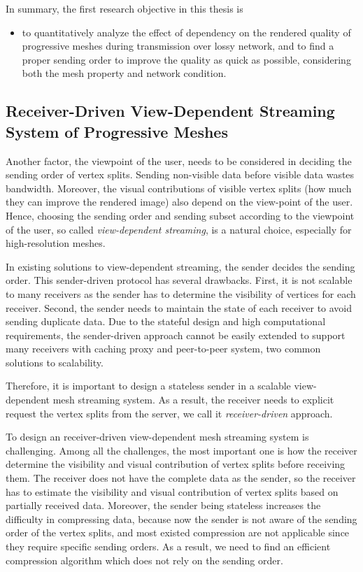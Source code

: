 \documentclass[11pt, a4paper]{report}
\begin{document}
    In summary, the first research objective in this thesis is
    \begin{itemize}
        \item
            to quantitatively analyze the effect of dependency on 
            the rendered quality of progressive meshes 
            during transmission over lossy network, and to find
            a proper sending order to improve the quality as quick
            as possible, considering both the mesh property and network condition. 
    \end{itemize}
    
    \subsection{Receiver-Driven View-Dependent Streaming System of Progressive Meshes}
    Another factor, the viewpoint of the user, 
    needs to be considered in deciding the sending order of vertex splits.
    Sending non-visible data before visible data wastes bandwidth. 
    Moreover, the visual contributions of visible
    vertex splits (how much they can improve the rendered image)
    also depend on the view-point of the user.
    Hence, choosing the sending order and sending subset 
    according to the viewpoint of the user, 
    so called \emph{view-dependent streaming}, 
    is a natural choice, especially
    for high-resolution meshes.
    
    In existing solutions to view-dependent streaming,  
    the sender decides the sending order. 
    This sender-driven protocol has several drawbacks. 
    First, it is not scalable to many receivers as the sender has to
    determine the visibility of vertices for each receiver. 
    Second, the sender needs to maintain
    the state of each receiver to avoid sending duplicate data. 
    Due to the stateful design and high computational requirements,
    the sender-driven approach cannot be easily extended to support 
    many receivers with caching proxy and peer-to-peer system,
    two common solutions to scalability. 

    Therefore, it is important to design a stateless sender in
    a scalable view-dependent mesh streaming system. As a result,
    the receiver needs to explicit request the vertex splits from
    the server, we call it \textit{receiver-driven} approach.
    
    To design an receiver-driven view-dependent mesh streaming
    system is challenging. Among all the challenges, the most important
    one is how the receiver determine the visibility and visual contribution
    of vertex splits before receiving them. The receiver does not have
    the complete data as the sender, so the receiver has to estimate
    the visibility and visual contribution of vertex splits based on 
    partially received data. Moreover, the sender being stateless increases
    the difficulty in compressing data, because now the sender is not aware
    of the sending order of the vertex splits, and most existed compression
    are not applicable since they require specific sending orders.
    As a result, we need to find an efficient 
    compression algorithm which does not rely on the sending order.
\end{document}
